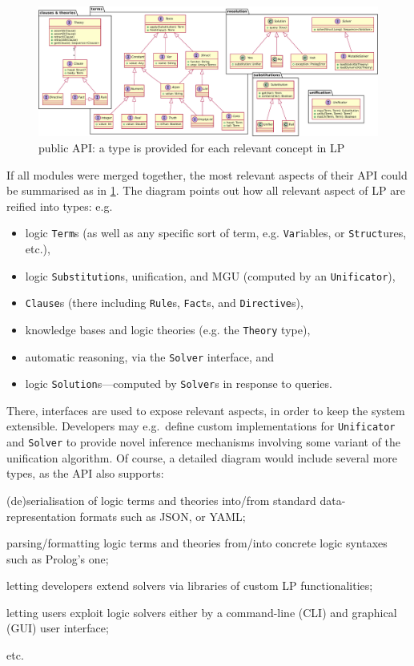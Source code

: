 \documentclass[12pt,a4paper,openright,twoside]{book}
\begin{document}
\begin{figure}
    \centering
    \includegraphics[width=\linewidth]{figures/2p-kt-api.pdf}
    \caption[\twopkt{} public API]{\twopkt{} public API: a type is provided for each relevant concept in LP}
    \label{fig:2p-kt-api}
\end{figure}

If all \twopkt{} modules were merged together, the most relevant aspects of their API could be summarised as in \cref{fig:2p-kt-api}.
%
The diagram points out how all relevant aspect of LP are reified into types: e.g.
%
\begin{itemize}
    \item logic \texttt{Term}s (as well as any specific sort of term, e.g. \texttt{Var}iables, or \texttt{Struct}ures, etc.),
    \item logic \texttt{Substitution}s, unification, and MGU (computed by an \texttt{Unificator}),
    \item \texttt{Clause}s (there including \texttt{Rule}s, \texttt{Fact}s, and \texttt{Directive}s),
    \item knowledge bases and logic theories (e.g. the \texttt{Theory} type),
    \item automatic reasoning, via the \texttt{Solver} interface, and
    \item logic \texttt{Solution}s---computed by \texttt{Solver}s in response to queries.
\end{itemize}
%
There, interfaces are used to expose relevant aspects, in order to keep the system extensible.
%
Developers may e.g.\ define custom implementations for \texttt{Unificator} and \texttt{Solver} to provide novel inference mechanisms involving some variant of the unification algorithm.
%
Of course, a detailed diagram would include several more types, as the \twopkt{} API also supports:
%
\begin{inlinelist}
    \item (de)se\-ria\-li\-sa\-tion of logic terms and theories into/from standard data-representation formats such as JSON, or YAML;
    \item parsing/formatting logic terms and theories from/into concrete logic syntaxes such as Prolog's one;
    \item letting developers extend solvers via libraries of custom LP functionalities;
    \item letting users exploit logic solvers either by a command-line (CLI) and graphical (GUI) user interface;
\end{inlinelist}
%
etc.
\end{document}
